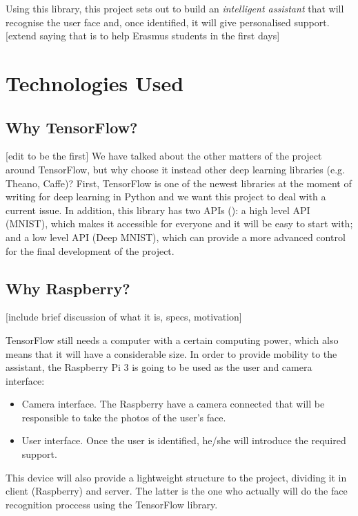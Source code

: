 Using this library, this project sets out to build an \textit{intelligent assistant} that will recognise the user face and, once identified, it will give personalised support. [extend saying that is to help Erasmus students in the first days] 


\section{Technologies Used}	

	\subsection{Why TensorFlow?}
	[edit to be the first]
	We have talked about the other matters of the project around TensorFlow, but why choose it instead other deep learning libraries (e.g. Theano, Caffe)? First, TensorFlow is one of the newest libraries at the moment of writing for deep learning in Python and we want this project to deal with a current issue. In addition, this library has two APIs (\cite{tensorflow_main_website}): a high level API (MNIST), which makes it accessible for everyone and it will be easy to start with; and a low level API (Deep MNIST), which can provide a more advanced control for the final development of the project.

	\subsection{Why Raspberry?}
	[include brief discussion of what it is, specs, motivation]

	TensorFlow still needs a computer with a certain computing power, which also means that it will have a considerable size. In order to provide mobility to the assistant, the Raspberry Pi 3 is going to be used as the user and camera interface:

	\begin{itemize}
		\item Camera interface. The Raspberry have a camera connected that will be responsible to take the photos of the user's face.
		\item User interface. Once the user is identified, he/she will introduce the required support.
	\end{itemize}

	This device will also provide a lightweight structure to the project, dividing it in client (Raspberry) and server. The latter is the one who actually will do the face recognition proccess using the TensorFlow library.

